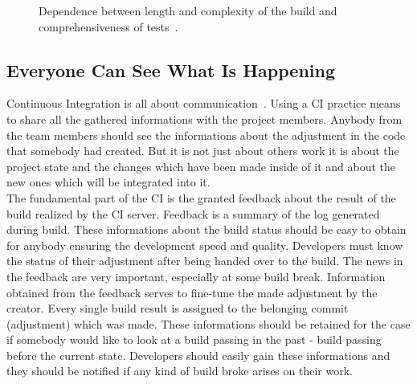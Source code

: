 \begin{figure}[H]
    \centering
    \caption{Dependence between length and complexity of the build and comprehensiveness of tests~\cite{deployment_automation}.}
    \label{fig:grap_dependence}
\end{figure}

\subsection{Everyone Can See What Is Happening}

Continuous Integration is all about communication~\cite{MartinFowler}. Using a CI practice means to share all the gathered informations with the project members. Anybody from the team members should see the informations about the adjustment in the code that somebody had created. But it is not just about others work it is about the project state and the changes which have been made inside of it and about the new ones which will be integrated into it.\\

The fundamental part of the CI is the granted feedback about the result of the build realized by the CI server. Feedback is a summary of the log generated during build. These informations about the build status should be easy to obtain for anybody ensuring the development speed and quality. Developers must know the status of their adjustment after being handed over to the build. The news in the feedback are very important, especially at some build break. Information obtained from the feedback serves to fine-tune the made adjustment by the creator. Every single build result is assigned to the belonging commit (adjustment) which was made. These informations should be retained for the case if somebody would like to look at a build passing in the past - build passing before the current state. Developers should easily gain these informations and they should be notified if any kind of build broke arises on their work.

